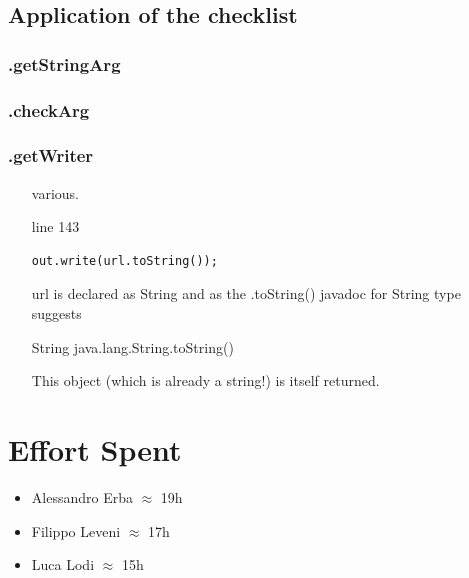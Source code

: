 \documentclass[english]{article}
\begin{document}
	\subsection{Application of the checklist}
	
\subsubsection*{.getStringArg}
\subsubsection*{.checkArg}
\subsubsection*{.getWriter}
\begin{itemize}
 \item[various.]{line 143
		\begin{lstlisting} 
out.write(url.toString());
		\end{lstlisting}
		url is declared as String and as the .toString() javadoc for String type suggests 
\begin{displayquote}
		String java.lang.String.toString()

This object (which is already a string!) is itself returned.
\end{displayquote}}
\end{itemize}





\clearpage
\section{Effort Spent} %
	\begin{itemize}
		\item Alessandro Erba $\approx$ 19h
		\item Filippo Leveni 	$\approx$ 17h
		\item Luca Lodi $\approx$ 15h
	\end{itemize}
\end{document}
